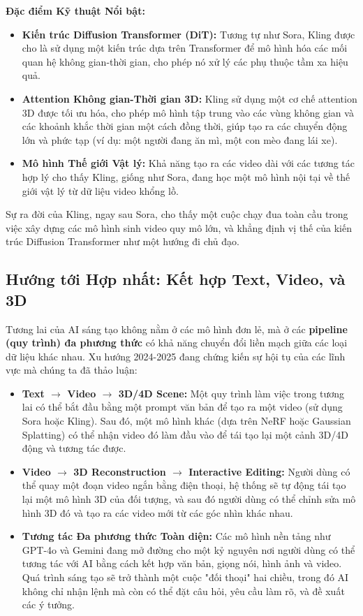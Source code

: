 \textbf{Đặc điểm Kỹ thuật Nổi bật:}
\begin{itemize}
	\item \textbf{Kiến trúc Diffusion Transformer (DiT):} Tương tự như Sora, Kling được cho là sử dụng một kiến trúc dựa trên Transformer để mô hình hóa các mối quan hệ không gian-thời gian, cho phép nó xử lý các phụ thuộc tầm xa hiệu quả.
	\item \textbf{Attention Không gian-Thời gian 3D:} Kling sử dụng một cơ chế attention 3D được tối ưu hóa, cho phép mô hình tập trung vào các vùng không gian và các khoảnh khắc thời gian một cách đồng thời, giúp tạo ra các chuyển động lớn và phức tạp (ví dụ: một người đang ăn mì, một con mèo đang lái xe).
	\item \textbf{Mô hình Thế giới Vật lý:} Khả năng tạo ra các video dài với các tương tác hợp lý cho thấy Kling, giống như Sora, đang học một mô hình nội tại về thế giới vật lý từ dữ liệu video khổng lồ.
\end{itemize}
Sự ra đời của Kling, ngay sau Sora, cho thấy một cuộc chạy đua toàn cầu trong việc xây dựng các mô hình sinh video quy mô lớn, và khẳng định vị thế của kiến trúc Diffusion Transformer như một hướng đi chủ đạo.

\subsection{Hướng tới Hợp nhất: Kết hợp Text, Video, và 3D}
\label{subsec:unified_multimodal_generation}
Tương lai của AI sáng tạo không nằm ở các mô hình đơn lẻ, mà ở các \textbf{pipeline (quy trình) đa phương thức} có khả năng chuyển đổi liền mạch giữa các loại dữ liệu khác nhau. Xu hướng 2024-2025 đang chứng kiến sự hội tụ của các lĩnh vực mà chúng ta đã thảo luận:
\begin{itemize}
	\item \textbf{Text $\rightarrow$ Video $\rightarrow$ 3D/4D Scene:} Một quy trình làm việc trong tương lai có thể bắt đầu bằng một prompt văn bản để tạo ra một video (sử dụng Sora hoặc Kling). Sau đó, một mô hình khác (dựa trên NeRF hoặc Gaussian Splatting) có thể nhận video đó làm đầu vào để tái tạo lại một cảnh 3D/4D động và tương tác được.
	\item \textbf{Video $\rightarrow$ 3D Reconstruction $\rightarrow$ Interactive Editing:} Người dùng có thể quay một đoạn video ngắn bằng điện thoại, hệ thống sẽ tự động tái tạo lại một mô hình 3D của đối tượng, và sau đó người dùng có thể chỉnh sửa mô hình 3D đó và tạo ra các video mới từ các góc nhìn khác nhau.
	\item \textbf{Tương tác Đa phương thức Toàn diện:} Các mô hình nền tảng như GPT-4o và Gemini đang mở đường cho một kỷ nguyên nơi người dùng có thể tương tác với AI bằng cách kết hợp văn bản, giọng nói, hình ảnh và video. Quá trình sáng tạo sẽ trở thành một cuộc "đối thoại" hai chiều, trong đó AI không chỉ nhận lệnh mà còn có thể đặt câu hỏi, yêu cầu làm rõ, và đề xuất các ý tưởng.
\end{itemize}

